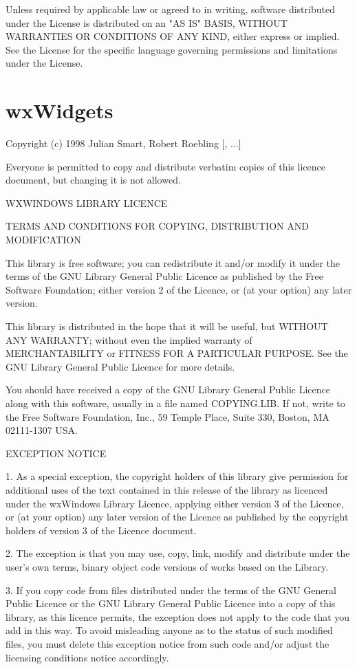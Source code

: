 \documentclass[twoside]{tceusermanual}
\begin{document}
   Unless required by applicable law or agreed to in writing, software
   distributed under the License is distributed on an "AS IS" BASIS,
   WITHOUT WARRANTIES OR CONDITIONS OF ANY KIND, either express or implied.
   See the License for the specific language governing permissions and
   limitations under the License.

\section{wxWidgets}

Copyright (c) 1998 Julian Smart, Robert Roebling [, ...]

Everyone is permitted to copy and distribute verbatim copies
of this licence document, but changing it is not allowed.

WXWINDOWS LIBRARY LICENCE

TERMS AND CONDITIONS FOR COPYING, DISTRIBUTION AND MODIFICATION

This library is free software; you can redistribute it and/or modify it
under the terms of the GNU Library General Public Licence as published by
the Free Software Foundation; either version 2 of the Licence, or (at
your option) any later version.

This library is distributed in the hope that it will be useful, but
WITHOUT ANY WARRANTY; without even the implied warranty of
MERCHANTABILITY or FITNESS FOR A PARTICULAR PURPOSE. See the GNU Library
General Public Licence for more details.

You should have received a copy of the GNU Library General Public Licence
along with this software, usually in a file named COPYING.LIB. If not,
write to the Free Software Foundation, Inc., 59 Temple Place, Suite 330,
Boston, MA 02111-1307 USA.

EXCEPTION NOTICE

1. As a special exception, the copyright holders of this library give
permission for additional uses of the text contained in this release of
the library as licenced under the wxWindows Library Licence, applying
either version 3 of the Licence, or (at your option) any later version of
the Licence as published by the copyright holders of version 3 of the
Licence document.

2. The exception is that you may use, copy, link, modify and distribute
under the user's own terms, binary object code versions of works based
on the Library.

3. If you copy code from files distributed under the terms of the GNU
General Public Licence or the GNU Library General Public Licence into a
copy of this library, as this licence permits, the exception does not
apply to the code that you add in this way. To avoid misleading anyone as
to the status of such modified files, you must delete this exception
notice from such code and/or adjust the licensing conditions notice
accordingly.
\end{document}
